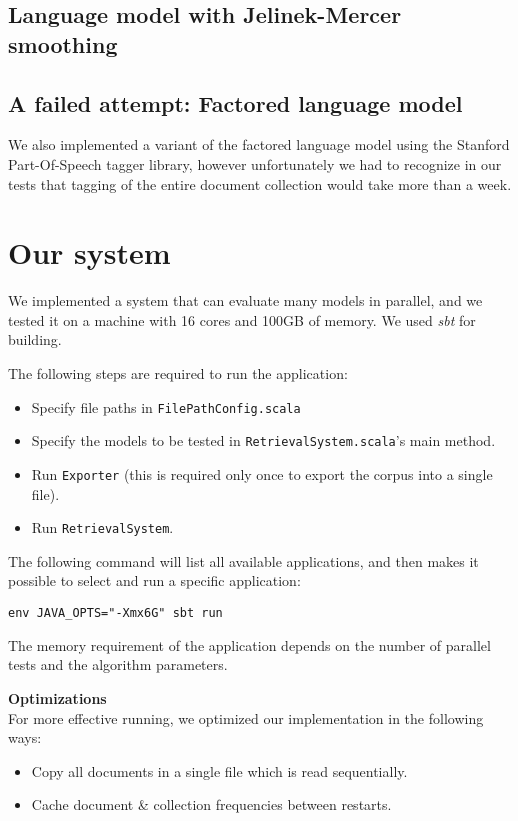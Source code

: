 \documentclass[12pt]{article}
\begin{document}
\subsection{Language model with Jelinek-Mercer smoothing}



\subsection{A failed attempt: Factored language model}
We also implemented a variant of the factored language model using the Stanford Part-Of-Speech tagger library, however unfortunately we had to recognize in our tests that tagging of the entire document collection would take more than a week.

\section{Our system}

We implemented a system that can evaluate many models in parallel, and we tested it on a machine with 16 cores and 100GB of memory. 
We used \textit{sbt} for building.

The following steps are required to run the application:
\begin{itemize}
	\item Specify file paths in \texttt{FilePathConfig.scala}
	\item Specify the models to be tested in \texttt{RetrievalSystem.scala}'s main method.
	\item Run \texttt{Exporter} (this is required only once to export the corpus into a single file).
	\item Run \texttt{RetrievalSystem}.

\end{itemize}
The following command will list all available applications, and then makes it possible to select and run a specific application:\\

{\centering
\texttt{env JAVA\_OPTS="-Xmx6G" sbt run} \par
}

The memory requirement of the application depends on the number of parallel tests and the algorithm parameters.



\vspace{0.5cm}
\textbf{Optimizations} \\
For more effective running, we optimized our implementation in the following ways:
\begin{itemize}
	\item Copy all documents in a single file which is read sequentially.
	\item Cache document \& collection frequencies between restarts.
\end{itemize}
\end{document}
